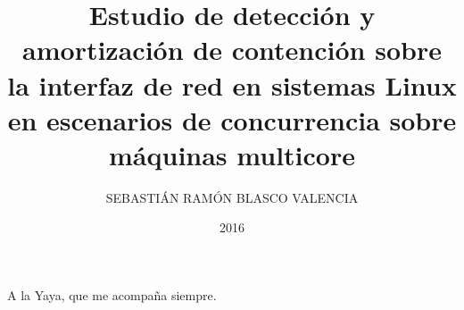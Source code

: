 \documentclass[upright, contnum]{umemoria}
\author{SEBASTIÁN RAMÓN BLASCO VALENCIA}
\title{Estudio de detección y amortización de contención sobre la interfaz de red en sistemas Linux en escenarios de concurrencia sobre máquinas multicore}
\date{2016}
\begin{document}
\frontmatter
\maketitle



\begin{dedicatoria} %
A la Yaya, que me acompaña siempre.
\end{dedicatoria}


\cleardoublepage

\tableofcontents
\listoftables %
\listoffigures %

\mainmatter

%

%
%

%



%

%







\end{document}
